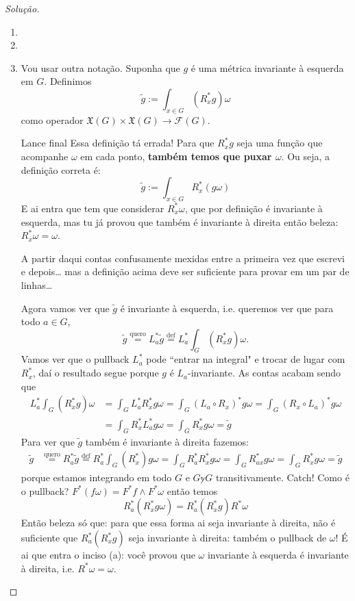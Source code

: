 \begin{proof}[Solução]\leavevmode
\begin{enumerate}[label=(\alph*)]
\item 
\item 
\item Vou usar outra notação. Suponha que \(g\) é uma métrica invariante à esquerda em \(G\). Definimos
	\[\tilde{g}:=\int_{x \in G}(R_x^*g)\omega\]
	como operador \(\mathfrak{X}(G)\times \mathfrak{X}(G) \longrightarrow \mathcal{F}(G)\).

	\begin{thing8}{Lance final}\leavevmode
Essa definição tá errada! Para que \(R_x^*g\) seja uma função que acompanhe \(\omega\) em cada ponto, \textbf{também temos que puxar \(\omega\)}. Ou seja, a definição correta é:
	\[\tilde{g}:=\int_{x \in G}R_x^*(g\omega)\]
E ai entra que tem que considerar \(R_x^*\omega\), que por definição é invariante à esquerda, mas tu já provou que também é invariante à direita então beleza: \(R_x^*\omega=\omega\).
	\end{thing8}
A partir daqui contas confusamente mexidas entre a primeira vez que escrevi e depois… mas a definição acima deve ser suficiente para provar em um par de linhas…

Agora vamos ver que \(\tilde{g}\) é invariante à esquerda, i.e. queremos ver que para todo \(a \in G\),
\[\tilde{g}\overset{\text{quero}}{=}L_a^*\tilde{g}\overset{\operatorname{def}}{=}L^*_a \int_G(R_x^*g)\omega.\]
Vamos ver que o pullback \(L^*_a\) pode ``entrar na integral" e trocar de lugar com \(R^*_x\), daí o resultado segue porque \(g\) é \(L_a\)-invariante. As contas acabam sendo que
\begin{align*}
L_a ^*\int_G (R^*_xg)\omega&=\int_GL_a ^*R_x^*g \omega=\int_G (L_a \circ R_x)^*g\omega=\int_G(R_x \circ L_a)^*g\omega\\
&=\int_G R_x ^*L_a ^*g\omega=\int_GR_x^*g \omega=\tilde{g}
\end{align*}
Para ver que \(\tilde{g}\) também  é invariante à direita fazemos:
\begin{align*}
\tilde{g}&\overset{\text{quero}}{=}R_a ^*\tilde{g}\overset{\operatorname{def}}{=}R_a ^*\int_G(R_x^*)g\omega=\int_G R^* _aR_x^* g\omega=\int_G R_{ax}^*g\omega=\int_GR_x^*g\omega=\tilde{g}
\end{align*}
porque estamos integrando em todo \(G\) e \(G \mathbb{y} G\) transitivamente. {\color{2}Catch!} Como é o pullback? \(F^*(f \omega)=F^*f \wedge F^*\omega\) então temos
\[R^*_a (R_x^*g \omega)=R^*_a(R^*_xg)R^*\omega\]
Então beleza só que: para que essa forma ai seja invariante à direita, não é suficiente que \(R^*_a(R^*_xg)\) seja invariante à direita: também o pullback de \(\omega\)! É ai que entra o inciso (a): você provou que \(\omega\) invariante à esquerda é invariante à direita, i.e. \(R^* \omega=\omega\).


\end{enumerate}
\end{proof}
